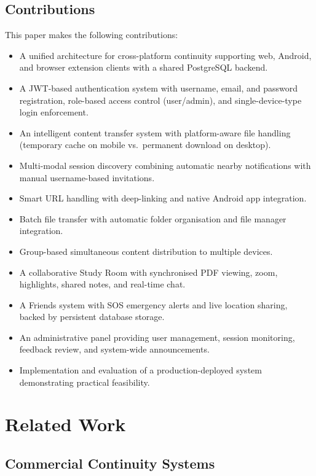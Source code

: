 \documentclass[conference]{IEEEtran}
\begin{document}
\subsection{Contributions}

This paper makes the following contributions:

\begin{itemize}
    \item A unified architecture for cross-platform continuity supporting web, Android, and browser extension clients with a shared PostgreSQL backend.
    \item A JWT-based authentication system with username, email, and password registration, role-based access control (user/admin), and single-device-type login enforcement.
    \item An intelligent content transfer system with platform-aware file handling (temporary cache on mobile vs.\ permanent download on desktop).
    \item Multi-modal session discovery combining automatic nearby notifications with manual username-based invitations.
    \item Smart URL handling with deep-linking and native Android app integration.
    \item Batch file transfer with automatic folder organisation and file manager integration.
    \item Group-based simultaneous content distribution to multiple devices.
    \item A collaborative Study Room with synchronised PDF viewing, zoom, highlights, shared notes, and real-time chat.
    \item A Friends system with SOS emergency alerts and live location sharing, backed by persistent database storage.
    \item An administrative panel providing user management, session monitoring, feedback review, and system-wide announcements.
    \item Implementation and evaluation of a production-deployed system demonstrating practical feasibility.
\end{itemize}

\section{Related Work}

\subsection{Commercial Continuity Systems}
\end{document}
